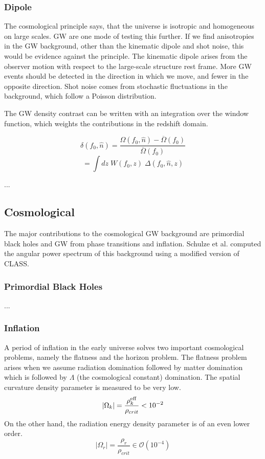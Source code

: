 \subsubsection{Dipole}
The cosmological principle says, that the universe is isotropic and homogeneous on large scales. GW are one mode of testing this further. If we find anisotropies in the GW background, other than the kinematic dipole and shot noise, this would be evidence against the principle.
The kinematic dipole arises from the observer motion with respect to the large-scale structure rest frame. More GW events should be detected in the direction in which we move, and fewer in the opposite direction. Shot noise comes from stochastic fluctuations in the background, which follow a Poisson distribution.

The GW density contrast can be written with an integration over the window function, which weights the contributions in the redshift domain.

\begin{equation}
    \delta(f_0, \hat{n}) = \frac{\Omega(f_0, \hat{n})-\overline{\Omega}(f_0)}{\overline{\Omega}(f_0)}
\end{equation}
\begin{equation}
    = \int dz \; W(f_0, z) \; \Delta(f_0, \hat{n}, z)
\end{equation}

...
\subsection{Cosmological}
The major contributions to the cosmological GW background are primordial
black holes and GW from phase transitions and inflation.
Schulze et al. \cite{schulze_gw_class_2023} computed the angular power spectrum 
of this background using a modified version of CLASS\cite{blas_cosmic_2011}.
\subsubsection{Primordial Black Holes}
...
\subsubsection{Inflation}

A period of inflation in the early universe solves two important cosmological problems, namely the flatness and the horizon problem. The flatness problem arises when we assume radiation domination followed by matter domination which is followed by $\Lambda$ (the cosmological constant) domination. The spatial curvature density parameter is measured to be very low. 
\begin{equation}
    |\Omega_k| = \frac{\rho_k^{\rm{eff}}}{\rho_{crit}} < 10^{-2}
\end{equation} 
On the other hand, the radiation energy density parameter is of an even lower order.
\begin{equation}
    |\Omega_r| = \frac{\rho_r}{\rho_{crit}} \in \mathcal{O}(10^{-4}) 
\end{equation}

